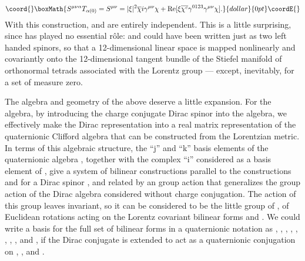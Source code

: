 \documentclass[a4paper,twocolumn,showpacs,preprintnumbers,aps]{revtex4}
\begin{document}
$$\coord{}\boxMath{S^{\mu\nu\alpha}T_{\alpha(0)}=S^{\mu\nu}=
          |\xi|^2\overline{\chi}i\gamma^{\mu\nu}\chi+
          \mathrm{Re}[\xi\overline{\chi^c}\gamma^{0123}\gamma^{\mu\nu}\chi].}{dollar}{0pt}\coordE{}$$
With this construction, \coordHE{} and \coordHE{} are entirely independent. This is
a little surprising, since \myHighlight{$\Phi$}\coordHE{} has played no essential r\^ole: \coordHE{}
and \coordHE{} could have been written just as two left handed spinors, so that
a 12-dimensional linear space is mapped nonlinearly and covariantly onto the 12-dimensional
tangent bundle of the Stiefel manifold of orthonormal tetrads associated with the Lorentz group
--- except, inevitably, for a set of measure zero.

The algebra and geometry of the above deserve a little expansion. For the algebra,
by introducing the charge conjugate Dirac spinor into the algebra, we effectively make the
Dirac representation into a real matrix representation
\coordHE{}
of the quaternionic Clifford algebra that can be constructed from the Lorentzian metric.
In terms of this algebraic structure, the ``j'' and ``k'' basis elements of the quaternionic
algebra \coordHE{}, together with the complex ``i'' considered as a basis element of
\coordHE{}, give a system of bilinear constructions parallel to the constructions
\coordHE{} and \coordHE{} for
a Dirac spinor \myHighlight{$\psi$}\coordHE{}, and related by an \coordHE{} group action that generalizes the \coordHE{}
group action of the Dirac algebra considered without charge conjugation. The action of
this \coordHE{} group leaves \myHighlight{$\overline{\psi}\gamma^\mu\psi$}\coordHE{} invariant, so it can be
considered to be the little group of \myHighlight{$\overline{\psi}\gamma^\mu\psi$}\coordHE{}, of Euclidean rotations
acting on the Lorentz covariant bilinear forms
\coordHE{} and \coordHE{}.
We could write a basis for the full set of bilinear forms in a quaternionic notation as
\myHighlight{$\overline{\psi}\psi$}\coordHE{},
\myHighlight{$\overline{\psi}\gamma^\mu\psi$}\coordHE{}, 
\coordHE{},
\coordHE{},
\coordHE{},
\coordHE{},
\coordHE{},
\coordHE{}, and
\coordHE{}, if the Dirac conjugate \myHighlight{$\overline{\psi}$}\coordHE{}
is extended to act as a quaternionic conjugation on \coordHE{}, \coordHE{}, and \coordHE{}.
\end{document}
